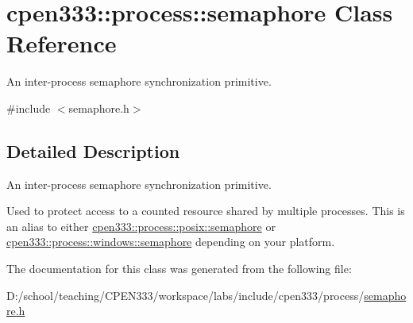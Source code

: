 \hypertarget{classcpen333_1_1process_1_1semaphore}{}\section{cpen333\+:\+:process\+:\+:semaphore Class Reference}
\label{classcpen333_1_1process_1_1semaphore}


An inter-\/process semaphore synchronization primitive.  




{\ttfamily \#include $<$semaphore.\+h$>$}



\subsection{Detailed Description}
An inter-\/process semaphore synchronization primitive. 

Used to protect access to a counted resource shared by multiple processes. This is an alias to either \hyperlink{classcpen333_1_1process_1_1posix_1_1semaphore}{cpen333\+::process\+::posix\+::semaphore} or \hyperlink{classcpen333_1_1process_1_1windows_1_1semaphore}{cpen333\+::process\+::windows\+::semaphore} depending on your platform. 

The documentation for this class was generated from the following file\+:\begin{DoxyCompactItemize}
\item 
D\+:/school/teaching/\+C\+P\+E\+N333/workspace/labs/include/cpen333/process/\hyperlink{process_2semaphore_8h}{semaphore.\+h}\end{DoxyCompactItemize}

